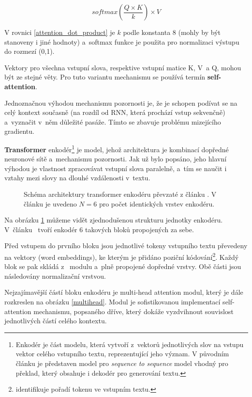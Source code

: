 \begin{equation}
    \label{attention_dot_product}
    softmax(\frac{Q \times K}{k})\times V
\end{equation}

V rovnici \ref{attention_dot_product} je $k$ podle \cite{Transformers} konstanta 8 (mohly by být stanoveny i jiné hodnoty) a~softmax funkce je použita pro normalizaci výstupu do rozmezí (0,1).\par
Vektory pro všechna vstupní slova, respektive vstupní matice K, V~a Q, mohou být ze stejné věty. Pro tuto variantu mechanismu se používá termín \textbf{self-attention}.\par 
Jednoznačnou výhodou mechanismu pozornosti je, že je schopen podívat se na celý kontext současně (na rozdíl od RNN, která prochází vstup sekvenčně) a~vyznačit v~něm důležité pasáže. Tímto se zbavuje problému mizejícího gradientu.\par\medskip

\textbf{Transformer} enkodér\footnote{Enkodér je část modelu, která vytvoří z~vektorů jednotlivých slov na vstupu vektor celého vstupního textu, reprezentující jeho význam. V původním článku \cite{Transformers} je představen model pro \emph{sequence to sequence} model vhodný pro překlad, který obsahuje i dekodér pro generování textu.} je model, jehož architektura je kombinací dopředné neuronové sítě a~mechanismu pozornosti. Jak už bylo popsáno, jeho hlavní výhodou je vlastnost zpracovávat vstupní slova paralelně, a~tím se naučit i vztahy mezi slovy na dlouhé vzdálenosti v~textu.\par

\begin{figure}[hbt]
    \centering
	\caption{Schéma architektury transformer enkodéru převzaté z článku \cite{Transformers}. V článku je uvedeno $N=6$ pro počet identických vrstev enkodéru. }
	\label{transformer_encoder}
\end{figure}

Na obrázku \ref{transformer_encoder} můžeme vidět zjednodušenou strukturu jednotky enkodéru. V~článku~\cite{Transformers} tvoří enkodér 6 takových bloků propojených za sebe.\par
Před vstupem do prvního bloku jsou jednotlivé tokeny vstupního textu převedeny na vektory (word embeddings), ke kterým je přidáno poziční kódování\footnote{identifikuje pořadí tokenu ve vstupním textu.}. Každý blok se pak skládá z~ modulu a~plně propojené dopředné vrstvy. Obě části jsou následovány normalizační vrstvou.\par
Nejzajímavější částí bloku enkodéru je multi-head attention modul, který je dále rozkreslen na obrázku \ref{multihead}. Modul je sofistikovanou implementací self-attention mechanismu, popsaného dříve, který dokáže vyzdvihnout souvislost jednotlivých částí celého kontextu. 

